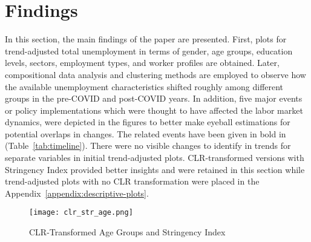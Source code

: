 \documentclass[a4paper,12pt]{article}
\begin{document}
\section{Findings}
In this section, the main findings of the paper are presented. First, plots for trend-adjusted total unemployment in terms of gender, age groups, education levels, sectors, employment types, and worker profiles are obtained. Later, compositional data analysis and clustering methods are employed to observe how the available unemployment characteristics shifted roughly among different groups in the pre-COVID and post-COVID years. In addition, five major events or policy implementations which were thought to have affected the labor market dynamics, were depicted in the figures to better make eyeball estimations for potential overlaps in changes. The related events have been given in bold in (Table~\ref{tab:timeline}). There were no visible changes to identify in trends for separate variables in initial trend-adjusted plots. CLR-transformed versions with Stringency Index provided better insights and were retained in this section while trend-adjusted plots with no CLR transformation were placed in the Appendix~\ref{appendix:descriptive-plots}.


\begin{figure}[H]
    \centering
        \texttt{[image: clr\_str\_age.png]}
        \caption{CLR-Transformed Age Groups and Stringency Index}
        \label{fig:clr_str_age}
\end{figure}
\end{document}
